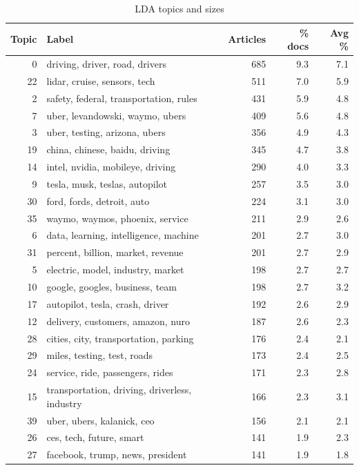 \begin{table}[H]
\centering
\caption{\label{tab:lda-topics}LDA topics and sizes}
\centering
\fontsize{7}{9}\selectfont
\begin{tabular}[t]{r>{\raggedright\arraybackslash}p{3.8cm}rrr}
\toprule
Topic & Label & Articles & \% docs & Avg \%\\
\midrule
0 & driving, driver, road, drivers & 685 & 9.3 & 7.1\\
22 & lidar, cruise, sensors, tech & 511 & 7.0 & 5.9\\
2 & safety, federal, transportation, rules & 431 & 5.9 & 4.8\\
7 & uber, levandowski, waymo, ubers & 409 & 5.6 & 4.8\\
3 & uber, testing, arizona, ubers & 356 & 4.9 & 4.3\\
19 & china, chinese, baidu, driving & 345 & 4.7 & 3.8\\
14 & intel, nvidia, mobileye, driving & 290 & 4.0 & 3.3\\
9 & tesla, musk, teslas, autopilot & 257 & 3.5 & 3.0\\
30 & ford, fords, detroit, auto & 224 & 3.1 & 3.0\\
35 & waymo, waymos, phoenix, service & 211 & 2.9 & 2.6\\
6 & data, learning, intelligence, machine & 201 & 2.7 & 3.0\\
31 & percent, billion, market, revenue & 201 & 2.7 & 2.9\\
5 & electric, model, industry, market & 198 & 2.7 & 2.7\\
10 & google, googles, business, team & 198 & 2.7 & 3.2\\
17 & autopilot, tesla, crash, driver & 192 & 2.6 & 2.9\\
12 & delivery, customers, amazon, nuro & 187 & 2.6 & 2.3\\
28 & cities, city, transportation, parking & 176 & 2.4 & 2.1\\
29 & miles, testing, test, roads & 173 & 2.4 & 2.5\\
24 & service, ride, passengers, rides & 171 & 2.3 & 2.8\\
15 & transportation, driving, driverless, industry & 166 & 2.3 & 3.1\\
39 & uber, ubers, kalanick, ceo & 156 & 2.1 & 2.1\\
26 & ces, tech, future, smart & 141 & 1.9 & 2.3\\
27 & facebook, trump, news, president & 141 & 1.9 & 1.8\\

\end{tabular}
\end{table}
